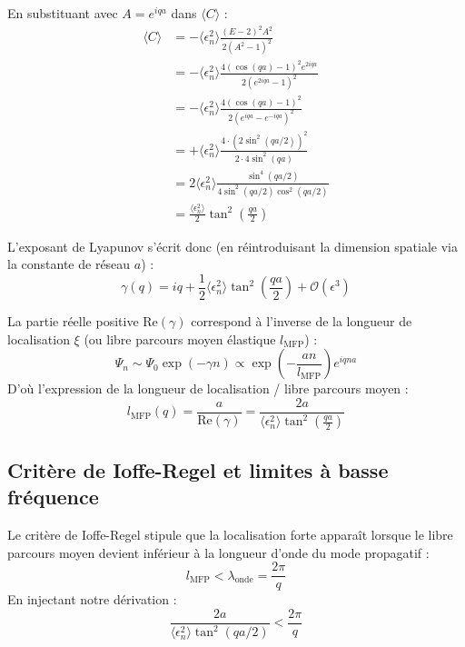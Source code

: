 En substituant avec $A = e^{iqa}$ dans $\langle C \rangle$ :
\begin{align}
    \langle C \rangle &= -\langle \epsilon_n^2 \rangle \frac{(E - 2)^2 A^2}{2(A^2 - 1)^2} \nonumber \\
    &= -\langle \epsilon_n^2 \rangle \frac{4(\cos(qa) - 1)^2 e^{2iqa}}{2(e^{2iqa} - 1)^2} \nonumber \\
    &= -\langle \epsilon_n^2 \rangle \frac{4(\cos(qa) - 1)^2}{2(e^{iqa} - e^{-iqa})^2} \nonumber \\
    &= +\langle \epsilon_n^2 \rangle \frac{4 \cdot \left( 2\sin^2(qa/2) \right)^2}{2 \cdot 4\sin^2(qa)} \nonumber \\
    &= 2 \langle \epsilon_n^2 \rangle \frac{\sin^4(qa/2)}{4\sin^2(qa/2)\cos^2(qa/2)} \nonumber \\
    &= \frac{\langle \epsilon_n^2 \rangle}{2} \tan^2\left(\frac{qa}{2}\right)
\end{align}

L'exposant de Lyapunov s'écrit donc (en réintroduisant la dimension spatiale via la constante de réseau $a$) :
\begin{equation*}
    \gamma(q) = iq + \frac{1}{2}\langle\epsilon_n^2\rangle \tan^2\left(\frac{qa}{2}\right) + \mathcal{O}(\epsilon^3)
\end{equation*}

La partie réelle positive $\text{Re}(\gamma)$ correspond à l'inverse de la longueur de localisation $\xi$ (ou libre parcours moyen élastique $l_{\text{MFP}}$) :
\begin{equation*}
    \Psi_n \sim \Psi_0 \exp(-\gamma n) \propto \exp\left( -\frac{an}{l_{\text{MFP}}} \right) e^{iqna}
\end{equation*}
D'où l'expression de la longueur de localisation / libre parcours moyen :
\begin{equation*}
    l_{\text{MFP}}(q) = \frac{a}{\text{Re}(\gamma)} = \frac{2a}{\langle\epsilon_n^2\rangle \tan^2\left(\frac{qa}{2}\right)}
\end{equation*}

\subsection{Critère de Ioffe-Regel et limites à basse fréquence}

Le critère de Ioffe-Regel stipule que la localisation forte apparaît lorsque le libre parcours moyen devient inférieur à la longueur d'onde du mode propagatif :
\begin{equation*}
    l_{\text{MFP}} < \lambda_{\text{onde}} = \frac{2\pi}{q}
\end{equation*}
En injectant notre dérivation :
\begin{equation*}
    \frac{2a}{\langle\epsilon_n^2\rangle \tan^2(qa/2)} < \frac{2\pi}{q}
\end{equation*}

